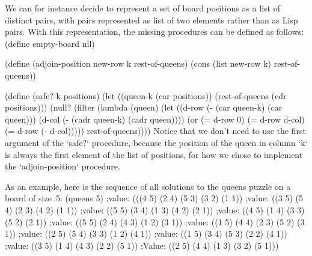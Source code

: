 We can for instance decide to represent a set of board positions as a list of distinct pairs, with pairs represented as list of two elements rather than as Lisp pairs.
With this representation, the missing procedures can be defined as follows:
\begtt\scm
(define empty-board nil)

(define (adjoin-position new-row k rest-of-queens)
  (cons (list new-row k) rest-of-queens))

(define (safe? k positions)
  (let ((queen-k (car positions))
        (rest-of-queens (cdr positions)))
    (null? (filter (lambda (queen)
                     (let ((d-row (- (car queen-k) (car queen)))
                           (d-col (- (cadr queen-k) (cadr queen))))
                       (or (= d-row 0)
                           (= d-row d-col)
                           (= d-row (- d-col)))))
                   rest-of-queens))))
\endtt
Notice that we don't need to use the first argument of the `safe?` procedure, because the position of the queen in column `k` is always the first element of the list of positions, for how we chose to implement the `adjoin-position` procedure.  

As an example, here is the sequence of all solutions to the queens puzzle on a board of size~5:
\begtt\scm
(queens 5)
;value: (((4 5) (2 4) (5 3) (3 2) (1 1))
;value:  ((3 5) (5 4) (2 3) (4 2) (1 1))
;value:  ((5 5) (3 4) (1 3) (4 2) (2 1))
;value:  ((4 5) (1 4) (3 3) (5 2) (2 1))
;value:  ((5 5) (2 4) (4 3) (1 2) (3 1))
;value:  ((1 5) (4 4) (2 3) (5 2) (3 1))
;value:  ((2 5) (5 4) (3 3) (1 2) (4 1))
;value:  ((1 5) (3 4) (5 3) (2 2) (4 1))
;value:  ((3 5) (1 4) (4 3) (2 2) (5 1))
;Value:  ((2 5) (4 4) (1 3) (3 2) (5 1)))
\endtt
